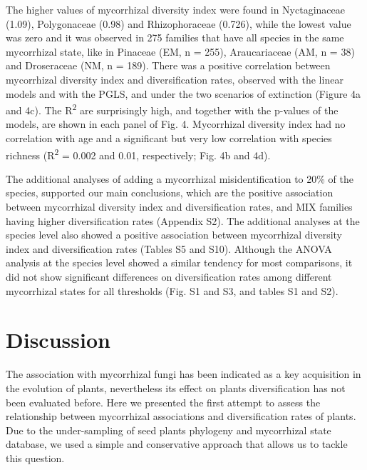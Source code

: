 \documentclass[
  12pt,
]{article}
\begin{document}
The higher values of mycorrhizal diversity index were found in
Nyctaginaceae (1.09), Polygonaceae (0.98) and Rhizophoraceae (0.726),
while the lowest value was zero and it was observed in 275 families that
have all species in the same mycorrhizal state, like in Pinaceae (EM, n
= 255), Araucariaceae (AM, n = 38) and Droseraceae (NM, n = 189). There
was a positive correlation between mycorrhizal diversity index and
diversification rates, observed with the linear models and with the
PGLS, and under the two scenarios of extinction (Figure 4a and 4c). The
R\textsuperscript{2} are surprisingly high, and together with the
p-values of the models, are shown in each panel of Fig. 4. Mycorrhizal
diversity index had no correlation with age and a significant but very
low correlation with species richness (R\textsuperscript{2} = 0.002 and
0.01, respectively; Fig. 4b and 4d).

The additional analyses of adding a mycorrhizal misidentification to
20\% of the species, supported our main conclusions, which are the
positive association between mycorrhizal diversity index and
diversification rates, and MIX families having higher diversification
rates (Appendix S2). The additional analyses at the species level also
showed a positive association between mycorrhizal diversity index and
diversification rates (Tables S5 and S10). Although the ANOVA analysis
at the species level showed a similar tendency for most comparisons, it
did not show significant differences on diversification rates among
different mycorrhizal states for all thresholds (Fig. S1 and S3, and
tables S1 and S2).

\hypertarget{discussion}{%
\section{Discussion}\label{discussion}}

The association with mycorrhizal fungi has been indicated as a key
acquisition in the evolution of plants, nevertheless its effect on
plants diversification has not been evaluated before. Here we presented
the first attempt to assess the relationship between mycorrhizal
associations and diversification rates of plants. Due to the
under-sampling of seed plants phylogeny and mycorrhizal state database,
we used a simple and conservative approach that allows us to tackle this
question.
\end{document}
